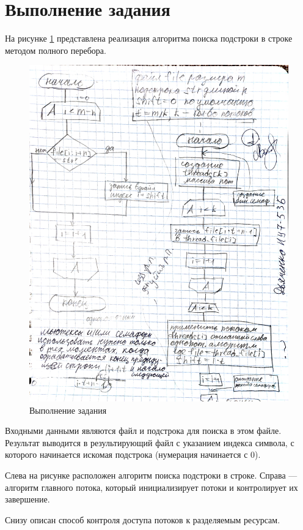 \section*{Выполнение задания}

На рисунке \ref{fig:photo} представлена реализация алгоритма поиска подстроки в строке методом полного перебора.

\begin{figure}
	\centering
	\includegraphics[width=0.7\linewidth]{task}
	\caption{Выполнение задания}
	\label{fig:photo}
\end{figure}

Входными данными являются файл и подстрока для поиска в этом файле.
Результат выводится в результирующий файл с указанием индекса символа, с которого
начинается искомая подстрока (нумерация начинается с 0).

Слева на рисунке расположен алгоритм поиска подстроки в строке.
Справа --- алгоритм главного потока, который инициализирует потоки и контролирует их завершение.

Снизу описан способ контроля доступа потоков к разделяемым ресурсам.